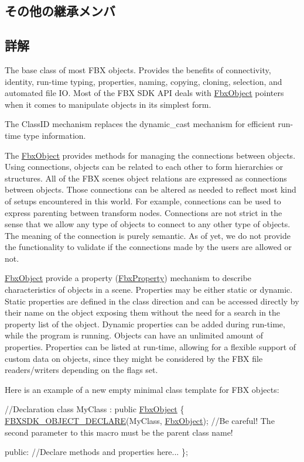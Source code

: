 \subsection*{その他の継承メンバ}


\subsection{詳解}
The base class of most F\+BX objects. Provides the benefits of connectivity, identity, run-\/time typing, properties, naming, copying, cloning, selection, and automated file IO. Most of the F\+BX S\+DK A\+PI deals with \hyperlink{class_fbx_object}{Fbx\+Object} pointers when it comes to manipulate objects in its simplest form.

The Class\+ID mechanism replaces the dynamic\+\_\+cast mechanism for efficient run-\/time type information.

The \hyperlink{class_fbx_object}{Fbx\+Object} provides methods for managing the connections between objects. Using connections, objects can be related to each other to form hierarchies or structures. All of the F\+BX scene\textquotesingle{}s object relations are expressed as connections between objects. Those connections can be altered as needed to reflect most kind of setups encountered in this world. For example, connections can be used to express parenting between transform nodes. Connections are not strict in the sense that we allow any type of objects to connect to any other type of objects. The meaning of the connection is purely semantic. As of yet, we do not provide the functionality to validate if the connections made by the users are allowed or not.

\hyperlink{class_fbx_object}{Fbx\+Object} provide a property (\hyperlink{class_fbx_property}{Fbx\+Property}) mechanism to describe characteristics of objects in a scene. Properties may be either static or dynamic. Static properties are defined in the class direction and can be accessed directly by their name on the object exposing them without the need for a search in the property list of the object. Dynamic properties can be added during run-\/time, while the program is running. Objects can have an unlimited amount of properties. Properties can be listed at run-\/time, allowing for a flexible support of custom data on objects, since they might be considered by the F\+BX file readers/writers depending on the flags set.

Here is an example of a new empty minimal class template for F\+BX objects\+: 
\begin{DoxyCode}
\textcolor{comment}{//Declaration}
\textcolor{keyword}{class }MyClass : \textcolor{keyword}{public} \hyperlink{class_fbx_object}{FbxObject}
\{
    \hyperlink{fbxobject_8h_a1628eb1d9b23ef9ce13f4406689fe50e}{FBXSDK\_OBJECT\_DECLARE}(MyClass, \hyperlink{class_fbx_object}{FbxObject});  \textcolor{comment}{//Be careful! The second
       parameter to this macro must be the parent class name!}

\textcolor{keyword}{public}:
    \textcolor{comment}{//Declare methods and properties here...}
\};
\end{DoxyCode}
 
